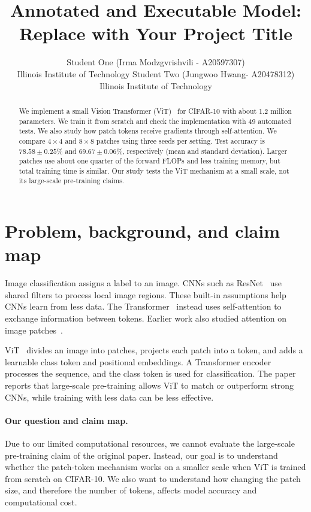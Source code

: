 \documentclass{article}
\title{Annotated and Executable Model: Replace with Your Project Title}
\author{%
  Student One (Irma Modzgvrishvili - A20597307) \\
  Illinois Institute of Technology
  \And
  Student Two (Jungwoo Hwang- A20478312) \\
  Illinois Institute of Technology
}
\begin{document}
\maketitle

\begin{abstract}
We implement a small Vision Transformer (ViT)~\citep{dosovitskiy2021image} for CIFAR-10 with about 1.2 million parameters. We train it from scratch and check the implementation with 49 automated tests. We also study how patch tokens receive gradients through self-attention. We compare $4\times4$ and $8\times8$ patches using three seeds per setting. Test accuracy is $78.58\pm0.25\%$ and $69.67\pm0.06\%$, respectively (mean and standard deviation). Larger patches use about one quarter of the forward FLOPs and less training memory, but total training time is similar. Our study tests the ViT mechanism at a small scale, not its large-scale pre-training claims.

\end{abstract}

\section{Problem, background, and claim map}

Image classification assigns a label to an image. CNNs such as ResNet~\citep{he2016deep} use shared filters to process local image regions. These built-in assumptions help CNNs learn from less data. The Transformer~\citep{vaswani2017attention} instead uses self-attention to exchange information between tokens. Earlier work also studied attention on image patches~\citep{cordonnier2020relationship}.

ViT~\citep{dosovitskiy2021image} divides an image into patches, projects each patch into a token, and adds a learnable class token and positional embeddings. A Transformer encoder processes the sequence, and the class token is used for classification. The paper reports that large-scale pre-training allows ViT to match or outperform strong CNNs, while training with less data can be less effective.

\paragraph{Our question and claim map.}
Due to our limited computational resources, we cannot evaluate the 
large-scale pre-training claim of the original paper. Instead, our goal 
is to understand whether the patch-token mechanism works on a smaller 
scale when ViT is trained from scratch on CIFAR-10. We also want to 
understand how changing the patch size, and therefore the number of 
tokens, affects model accuracy and computational cost.
\end{document}
